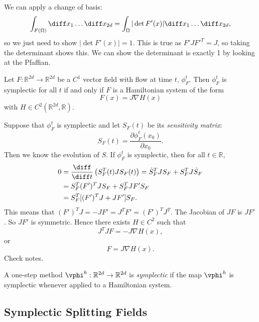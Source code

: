 \documentclass[12pt]{article}
\begin{document}
\begin{proofbox}
	We can apply a change of basis:
	\[
	\int_{F(\Omega)} \diff x_1 \ldots \diff x_{2d} = \int_{\Omega} |\det F'(x)| \diff x_1 \ldots \diff x_{2d},
	\]
	so we just need to show $|\det F'(x)| = 1$. This is true as $F' J F'^{T} = J$, so taking the determinant shows this. We can show the determinant is exactly 1 by looking at the Pfaffian.
\end{proofbox}

\begin{lemma}
	Let $F : \mathbb{R}^{2d} \to \mathbb{R}^{2d}$ be a $C^{1}$ vector field with flow at time $t$, $\phi_F^{t}$. Then $\phi_F^{t}$ is symplectic for all $t$ if and only if $F$ is a Hamiltonian system of the form
	\[
	F(x) =  J \nabla H(x)
	\]
	with $H \in C^2(\mathbb{R}^{2d}, \mathbb{R})$.
\end{lemma}

\begin{proofbox}
	Suppose that $\phi_F^{t}$ is symplectic and let $S_F(t)$ be its \emph{sensitivity matrix}:
	\[
	S_F(t) = \frac{\partial \phi_F^{t}(x_0)}{\partial x_0}.
	\]
	Then we know the evolution of $S$. If $\phi_F^{t}$ is symplectic, then for all $t \in \mathbb{R}$,
	\begin{align*}
		0 &= \frac{\diff}{\diff t} \left( S_F^{T}(t) J S_F(t) \right) = \dot S_F^{T} J S_F + S_F^{T} J \dot S_F \\
		  &= S_F^{T}(F')^{T} J S_F + S_F^{T} J F' S_F \\
		  &= S_F^{T}[(F')^{T}J + J F']S_F.
	\end{align*}
	This means that $(F')^{T} J = - J F' = J^{T} F' = (F')^{T} J^{T}$. The Jacobian of $JF$ is $JF'$. So $JF'$ is symmetric. Hence there exists $H \in C^2$ such that
	\[
	J^{T}J F = - J \nabla H(x),
	\]
	or
	\[
	F = J \nabla H(x).
	\]
	Check notes.
\end{proofbox}


\begin{definition}
	A one-step method $\vphi^{h} : \mathbb{R}^{2d} \to \mathbb{R}^{2d}$ is \emph{symplectic} if the map $\vphi^{h}$ is symplectic whenever applied to a Hamiltonian system.
\end{definition}

\subsection{Symplectic Splitting Fields}%
\label{sub:ssf}
\end{document}
